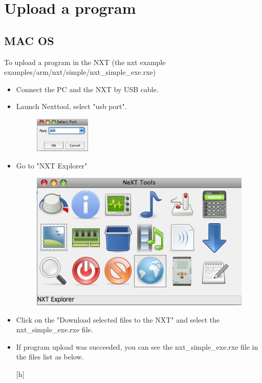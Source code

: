 \section{Upload a program} \label{uploadprogram}
\subsection{MAC OS}
To upload a program in the NXT (the nxt example examples/arm/nxt/simple/nxt\_simple\_exe.rxe)
\begin{itemize}
\item Connect the PC and the NXT by USB cable.
\item Launch Nexttool, select "usb port".
	\begin{figure}[htbp] %
   		\centering
		\includegraphics[width=0.25\textwidth]{pictures/usbport.jpg}
	\end{figure}
\item Go to "NXT Explorer"
	\begin{figure}[htbp] %
   		\centering
		\includegraphics[width=.7\textwidth]{pictures/nxtexplorer.jpg}
	\end{figure}
\item Click on the "Download selected files to the NXT" and select the nxt\_simple\_exe.rxe file.
\item If program upload was succeeded, you can see the nxt\_simple\_exe.rxe file in the files list as below.
	\begin{center}[h] %

\end{center}
\end{itemize}
